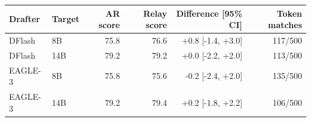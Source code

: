 \begin{tabular}{llrrrr}
\toprule
Drafter & Target & AR score & Relay score & Difference [95\% CI] & Token matches \\
\midrule
DFlash & 8B & 75.8 & 76.6 & +0.8 [-1.4, +3.0] & 117/500 \\
DFlash & 14B & 79.2 & 79.2 & +0.0 [-2.2, +2.0] & 113/500 \\
EAGLE-3 & 8B & 75.8 & 75.6 & -0.2 [-2.4, +2.0] & 135/500 \\
EAGLE-3 & 14B & 79.2 & 79.4 & +0.2 [-1.8, +2.2] & 106/500 \\
\bottomrule
\end{tabular}
